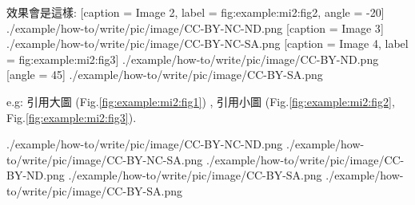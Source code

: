 \begin{enumerate}
{      \newpage
      效果會是這樣:
        {
          [caption = {Image 2},
            label = {fig:example:mi2:fig2},
            angle = -20]
            {./example/how-to/write/pic/image/CC-BY-NC-ND.png}
        }%
        {
          [caption = {Image 3}]
            {./example/how-to/write/pic/image/CC-BY-NC-SA.png}
        }%
        {
          [caption = {Image 4},
            label = {fig:example:mi2:fig3}]
            {./example/how-to/write/pic/image/CC-BY-ND.png}
        }%
        {
          [angle = 45]
            {./example/how-to/write/pic/image/CC-BY-SA.png}
        }
    } %

      e.g: 
      引用大圖 (Fig.\ref{fig:example:mi2:fig1}) ,
      引用小圖 (Fig.\ref{fig:example:mi2:fig2}, Fig.\ref{fig:example:mi2:fig3}).


    \newpage

        {
          {./example/how-to/write/pic/image/CC-BY-NC-ND.png}
        }%
        {
          {./example/how-to/write/pic/image/CC-BY-NC-SA.png}
        }%
        {
          {./example/how-to/write/pic/image/CC-BY-ND.png}
        }%
        {
          {./example/how-to/write/pic/image/CC-BY-SA.png}
        }%
        {
          {./example/how-to/write/pic/image/CC-BY-SA.png}
        }
  \end{enumerate}

\EndChapter

